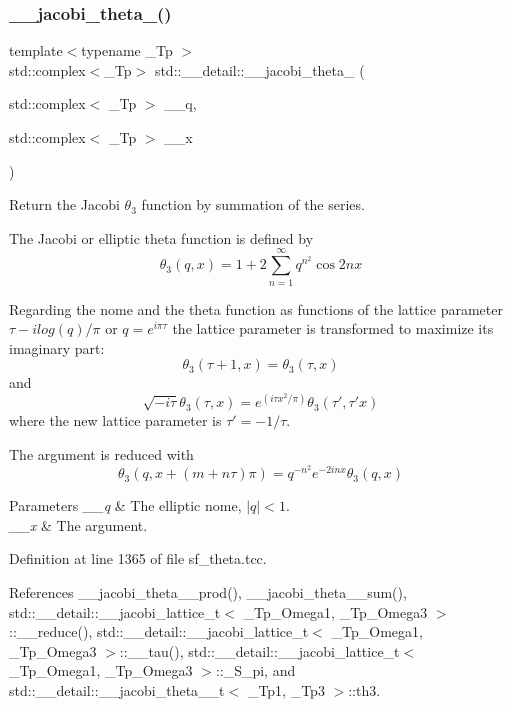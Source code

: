 \subsubsection{\texorpdfstring{\+\_\+\+\_\+jacobi\+\_\+theta\+\_()}{\_\_jacobi\_theta\_3()}\hspace{0.1cm}{\footnotesize\ttfamily [1/2]}}
{\footnotesize\ttfamily template$<$typename \+\_\+\+Tp $>$ \\
std\+::complex$<$\+\_\+\+Tp$>$ std\+::\+\_\+\+\_\+detail\+::\+\_\+\+\_\+jacobi\+\_\+theta\+\_ (\begin{DoxyParamCaption}\item[{std\+::complex$<$ \+\_\+\+Tp $>$}]{\+\_\+\+\_\+q,  }\item[{std\+::complex$<$ \+\_\+\+Tp $>$}]{\+\_\+\+\_\+x }\end{DoxyParamCaption})}

Return the Jacobi $ \theta_3 $ function by summation of the series.

The Jacobi or elliptic theta function is defined by \[ \theta_3(q,x) = 1 + 2\sum_{n=1}^{\infty} q^{n^2}\cos{2nx} \]

Regarding the nome and the theta function as functions of the lattice parameter $ \tau -i log(q)/ \pi $ or $ q = e^{i\pi\tau} $ the lattice parameter is transformed to maximize its imaginary part\+: \[ \theta_3(\tau+1,x) = \theta_3(\tau,x) \] and \[ \sqrt{-i\tau}\theta_3(\tau,x) = e^{(i\tau x^2/\pi)}\theta_3(\tau',\tau' x) \] where the new lattice parameter is $ \tau' = -1/\tau $.

The argument is reduced with \[ \theta_3(q, x + (m+n\tau)\pi) = q^{-n^2} e^{-2inx} \theta_3(q, x) \]


\begin{DoxyParams}{Parameters}
{\em \+\_\+\+\_\+q} & The elliptic nome, $ |q| < 1 $. \\
\hline
{\em \+\_\+\+\_\+x} & The argument. \\
\hline
\end{DoxyParams}


Definition at line 1365 of file sf\+\_\+theta.\+tcc.



References \+\_\+\+\_\+jacobi\+\_\+theta\+\_\+\_\+prod(), \+\_\+\+\_\+jacobi\+\_\+theta\+\_\+\_\+sum(), std\+::\+\_\+\+\_\+detail\+::\+\_\+\+\_\+jacobi\+\_\+lattice\+\_\+t$<$ \+\_\+\+Tp\+\_\+\+Omega1, \+\_\+\+Tp\+\_\+\+Omega3 $>$\+::\+\_\+\+\_\+reduce(), std\+::\+\_\+\+\_\+detail\+::\+\_\+\+\_\+jacobi\+\_\+lattice\+\_\+t$<$ \+\_\+\+Tp\+\_\+\+Omega1, \+\_\+\+Tp\+\_\+\+Omega3 $>$\+::\+\_\+\+\_\+tau(), std\+::\+\_\+\+\_\+detail\+::\+\_\+\+\_\+jacobi\+\_\+lattice\+\_\+t$<$ \+\_\+\+Tp\+\_\+\+Omega1, \+\_\+\+Tp\+\_\+\+Omega3 $>$\+::\+\_\+\+S\+\_\+pi, and std\+::\+\_\+\+\_\+detail\+::\+\_\+\+\_\+jacobi\+\_\+theta\+\_\+\_\+t$<$ \+\_\+\+Tp1, \+\_\+\+Tp3 $>$\+::th3.



